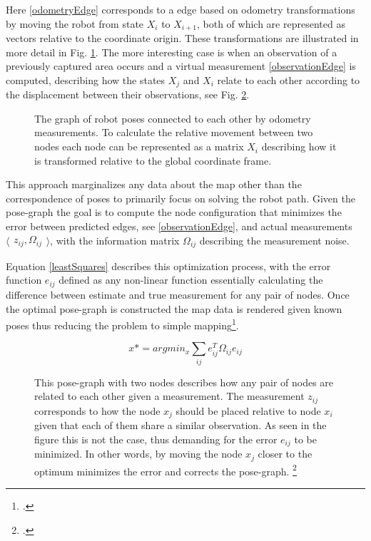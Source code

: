 Here \ref{odometryEdge} corresponds to a edge based on odometry transformations by moving the robot from state $X_{i}$ to $X_{i+1}$, both of which are represented as vectors relative to the coordinate origin.
These transformations are illustrated in more detail in Fig. \ref{fig:poseGraphTransformation}.
The more interesting case is when an observation of a previously captured area occurs and a virtual measurement \ref{observationEdge} is computed, describing how the states $X_{j}$ and $X_{i}$ relate to each other according to the displacement between their observations, see Fig. \ref{fig:poseGraphOptimization}.

\begin{figure}
	\centering
	
	\caption{
		The graph of robot poses connected to each other by odometry measurements. To calculate the relative movement between two nodes each node can be represented as a matrix $X_{i}$ describing how it is transformed relative to the global coordinate frame.
	}
	\label{fig:poseGraphTransformation}
\end{figure}



This approach marginalizes any data about the map other than the correspondence of poses to primarily focus on solving the robot path. 
Given the pose-graph the goal is to compute the node configuration that minimizes the error between predicted edges, see \ref{observationEdge}, and actual measurements 
$
\langle
\begin{matrix}
	z_{ij},  \Omega_{ij}
\end{matrix}
\rangle
$, with the information matrix $\Omega_{ij}$ describing the measurement noise.

Equation \ref{leastSquares} describes this optimization process, with the error function $e_{ij}$ defined as any non-linear function essentially calculating the difference between estimate and true measurement for any pair of nodes. 
Once the optimal pose-graph is constructed the map data is rendered given known poses thus reducing the problem to simple mapping\footcite{grisetti2010graphSLAM}.

\begin{equation}\label{leastSquares}
	x* = argmin_{x} \sum_{ij}e_{ij}^{T} \Omega_{ij} e_{ij}
\end{equation}


\begin{figure}
	\centering
	
	\caption{
		This pose-graph with two nodes describes how any pair of nodes are related to each other given a measurement. The measurement $ z_{ij} $ corresponds to how the node $x_{j}$ should be placed relative to node $x_{i}$ given that each of them share a similar observation. As seen in the figure this is not the case, thus demanding for the error $e_{ij}$ to be minimized. In other words, by moving the node $x_{j}$ closer to the optimum minimizes the error and corrects the pose-graph. \footcite{grisetti2010graphSLAM}
	}
	\label{fig:poseGraphOptimization}
\end{figure}



